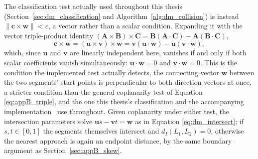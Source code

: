 The classification test actually used throughout this thesis (Section~\ref{sec:dm_classification}
and Algorithm~\ref{alg:dm_collision}) is instead $\lVert\mathbf{c}\times\mathbf{w}\rVert <
\varepsilon$, a vector rather than a scalar condition. Expanding it with the vector triple-product
identity $(\mathbf{A}\times\mathbf{B})\times\mathbf{C} = \mathbf{B}(\mathbf{A}\cdot\mathbf{C}) -
\mathbf{A}(\mathbf{B}\cdot\mathbf{C})$,
\begin{equation}
\mathbf{c}\times\mathbf{w} = (\mathbf{u}\times\mathbf{v})\times\mathbf{w}
= \mathbf{v}(\mathbf{u}\cdot\mathbf{w}) - \mathbf{u}(\mathbf{v}\cdot\mathbf{w}),
\label{eq:appB_cwtriple}
\end{equation}
which, since $\mathbf{u}$ and $\mathbf{v}$ are linearly independent here, vanishes if and only if
both scalar coefficients vanish simultaneously: $\mathbf{u}\cdot\mathbf{w} = 0$ and
$\mathbf{v}\cdot\mathbf{w} = 0$. This is the condition the implemented test actually detects, the
connecting vector $\mathbf{w}$ between the two segments' start points is perpendicular to both
direction vectors at once, a stricter condition than the general coplanarity test of Equation
\eqref{eq:appB_triple}, and the one this thesis's classification and the accompanying
implementation~\citep{sk2025distance} use throughout. Given coplanarity under either test, the
intersection parameters solve $\mathbf{u}s - \mathbf{v}t = \mathbf{w}$ as in Equation
\eqref{eq:dm_intersect}; if $s,t \in [0,1]$ the segments themselves intersect and
$d_I(L_1,L_2)=0$, otherwise the nearest approach is again an endpoint distance, by the same
boundary argument as Section~\ref{sec:appB_skew}.



